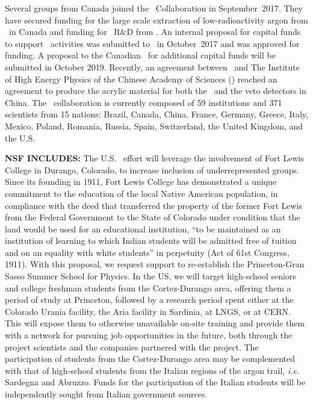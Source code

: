 Several groups from Canada joined the \DSs\ Collaboration in September~2017. They have secured funding for the large scale extraction of low-radioactivity argon from \CFI\ in Canada and funding for \DEAP\ R\&D from \NSERC.  An internal proposal for capital funds to support \DSks\ activities was submitted to \TRIUMF\ in October~2017 and was approved for funding.  A proposal to the Canadian \CFI\ for additional capital funds will be submitted in October 2019.  Recently, an agreement between \INFN\ and The Institute of High Energy Physics of the Chinese Academy of Sciences (\IHEP) reached an agreement to produce the acrylic material for both the \TPC\ and the veto detectors in China.  The \GADMC\ collaboration is currently composed of \num{59} institutions and \num{371} scientists from 15 nations: Brazil, Canada, China, France, Germany, Greece, Italy, Mexico, Poland, Romania, Russia, Spain, Switzerland, the United Kingdom, and the U.S.

{\bf NSF INCLUDES:}
The U.S. \DSk\ effort will leverage the involvement of Fort Lewis College in Durango, Colorado, to increase inclusion of underrepresented groups.  Since its founding in 1911, Fort Lewis College has demonstrated a unique commitment to the education of the local Native American population, in compliance with the deed that transferred the property of the former Fort Lewis from the Federal Government to the State of Colorado under condition that the land would be used for an educational institution, ``to be maintained as an institution of learning to which Indian students will be admitted free of tuition and on an equality with white students'' in perpetuity (Act of 61st Congress, 1911).  With this proposal, we request support to re-establish the Princeton-Gran Sasso Summer School for Physics. In the US, we will target high-school seniors and college freshman students from the Cortez-Durango area, offering them a period of study at Princeton, followed by a research period spent either at the Colorado Urania facility, the Aria facility in Sardinia, at LNGS, or at CERN.  This will expose them to otherwise unavailable on-site training and provide them with a network for pursuing job opportunities in the future, both through the project scientists and the companies partnered with the project.  The participation of students from the Cortez-Durango area may be complemented with that of high-school students from the Italian regions of the argon trail, {\it i.e.} Sardegna and Abruzzo. Funds for the participation of the Italian students will be independently sought from Italian government sources.